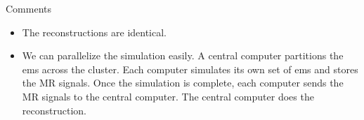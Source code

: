 \documentclass[dvipsnames]{beamer}
\begin{document}
\begin{frame}{Comments}
\begin{itemize}
\item The reconstructions are identical.
\item We can parallelize the simulation easily. A central computer partitions the ems across the cluster. Each computer simulates its own set of ems and stores the MR signals. Once the simulation is complete, each computer sends the MR signals to the central computer. The central computer does the reconstruction.
\end{itemize}
\end{frame}
\end{document}
